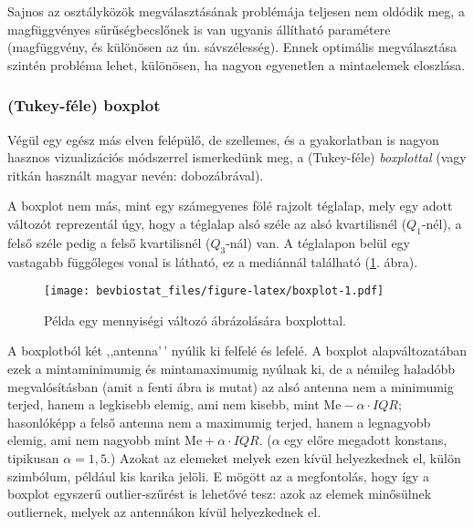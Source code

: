 \documentclass[
]{book}
\newenvironment{Shaded}{\begin{snugshade}}{\end{snugshade}}
\newcommand{\FunctionTok}[1]{\textcolor[rgb]{0.00,0.00,0.00}{#1}}
\newcommand{\NormalTok}[1]{#1}
\newcommand{\SpecialCharTok}[1]{\textcolor[rgb]{0.00,0.00,0.00}{#1}}
\begin{document}
Sajnos az osztályközök megválasztásának problémája teljesen nem oldódik meg, a magfüggvényes sűrűségbecslőnek is van ugyanis állítható paramétere (magfüggvény, és különösen az ún. sávszélesség). Ennek optimális megválasztása szintén probléma lehet, különösen, ha nagyon egyenetlen a mintaelemek eloszlása.

\hypertarget{deskriptivmennyegyvaltgrafikusboxplot}{%
\subsubsection{(Tukey-féle) boxplot}\label{deskriptivmennyegyvaltgrafikusboxplot}}

Végül egy egész más elven felépülő, de szellemes, és a gyakorlatban is nagyon hasznos vizualizációs módszerrel ismerkedünk meg, a (Tukey-féle) \emph{boxplottal} (vagy ritkán használt magyar nevén: dobozábrával).

A boxplot nem más, mint egy számegyenes fölé rajzolt téglalap, mely egy adott változót reprezentál úgy, hogy a téglalap alsó széle az alsó kvartilisnél (\(Q_1\)-nél), a felső széle pedig a felső kvartilisnél (\(Q_3\)-nál) van. A téglalapon belül egy vastagabb függőleges vonal is látható, ez a mediánnál található (\ref{fig:boxplot}. ábra).

\begin{Shaded}
\end{Shaded}

\begin{figure}
\centering
\texttt{[image: bevbiostat\_files/figure-latex/boxplot-1.pdf]}
\caption{\label{fig:boxplot}Példa egy mennyiségi változó ábrázolására boxplottal.}
\end{figure}

A boxplotból két ,,antenna'\,' nyúlik ki felfelé és lefelé. A boxplot alapváltozatában ezek a mintaminimumig és mintamaximumig nyúlnak ki, de a némileg haladóbb megvalósításban (amit a fenti ábra is mutat) az alsó antenna nem a minimumig terjed, hanem a legkisebb elemig, ami nem kisebb, mint \(\mathrm{Me}-\alpha \cdot IQR\); hasonlóképp a felső antenna nem a maximumig terjed, hanem a legnagyobb elemig, ami nem nagyobb mint \(\mathrm{Me}+\alpha \cdot IQR\). (\(\alpha\) egy előre megadott konstans, tipikusan \(\alpha=1,\!5\).) Azokat az elemeket melyek ezen kívül helyezkednek el, külön szimbólum, például kis karika jelöli. E mögött az a megfontolás, hogy így a boxplot egyszerű outlier-szűrést is lehetővé tesz: azok az elemek minősülnek outliernek, melyek az antennákon kívül helyezkednek el.
\end{document}
